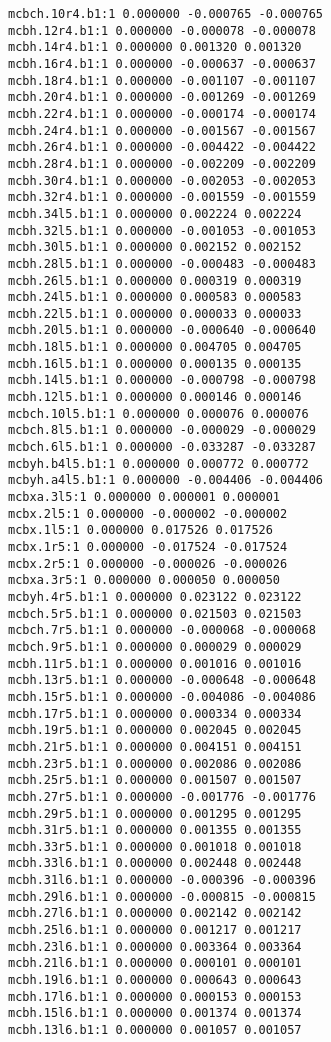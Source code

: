 \begin{verbatim}
mcbch.10r4.b1:1 0.000000 -0.000765 -0.000765
mcbh.12r4.b1:1 0.000000 -0.000078 -0.000078
mcbh.14r4.b1:1 0.000000 0.001320 0.001320
mcbh.16r4.b1:1 0.000000 -0.000637 -0.000637
mcbh.18r4.b1:1 0.000000 -0.001107 -0.001107
mcbh.20r4.b1:1 0.000000 -0.001269 -0.001269
mcbh.22r4.b1:1 0.000000 -0.000174 -0.000174
mcbh.24r4.b1:1 0.000000 -0.001567 -0.001567
mcbh.26r4.b1:1 0.000000 -0.004422 -0.004422
mcbh.28r4.b1:1 0.000000 -0.002209 -0.002209
mcbh.30r4.b1:1 0.000000 -0.002053 -0.002053
mcbh.32r4.b1:1 0.000000 -0.001559 -0.001559
mcbh.34l5.b1:1 0.000000 0.002224 0.002224
mcbh.32l5.b1:1 0.000000 -0.001053 -0.001053
mcbh.30l5.b1:1 0.000000 0.002152 0.002152
mcbh.28l5.b1:1 0.000000 -0.000483 -0.000483
mcbh.26l5.b1:1 0.000000 0.000319 0.000319
mcbh.24l5.b1:1 0.000000 0.000583 0.000583
mcbh.22l5.b1:1 0.000000 0.000033 0.000033
mcbh.20l5.b1:1 0.000000 -0.000640 -0.000640
mcbh.18l5.b1:1 0.000000 0.004705 0.004705
mcbh.16l5.b1:1 0.000000 0.000135 0.000135
mcbh.14l5.b1:1 0.000000 -0.000798 -0.000798
mcbh.12l5.b1:1 0.000000 0.000146 0.000146
mcbch.10l5.b1:1 0.000000 0.000076 0.000076
mcbch.8l5.b1:1 0.000000 -0.000029 -0.000029
mcbch.6l5.b1:1 0.000000 -0.033287 -0.033287
mcbyh.b4l5.b1:1 0.000000 0.000772 0.000772
mcbyh.a4l5.b1:1 0.000000 -0.004406 -0.004406
mcbxa.3l5:1 0.000000 0.000001 0.000001
mcbx.2l5:1 0.000000 -0.000002 -0.000002
mcbx.1l5:1 0.000000 0.017526 0.017526
mcbx.1r5:1 0.000000 -0.017524 -0.017524
mcbx.2r5:1 0.000000 -0.000026 -0.000026
mcbxa.3r5:1 0.000000 0.000050 0.000050
mcbyh.4r5.b1:1 0.000000 0.023122 0.023122
mcbch.5r5.b1:1 0.000000 0.021503 0.021503
mcbch.7r5.b1:1 0.000000 -0.000068 -0.000068
mcbch.9r5.b1:1 0.000000 0.000029 0.000029
mcbh.11r5.b1:1 0.000000 0.001016 0.001016
mcbh.13r5.b1:1 0.000000 -0.000648 -0.000648
mcbh.15r5.b1:1 0.000000 -0.004086 -0.004086
mcbh.17r5.b1:1 0.000000 0.000334 0.000334
mcbh.19r5.b1:1 0.000000 0.002045 0.002045
mcbh.21r5.b1:1 0.000000 0.004151 0.004151
mcbh.23r5.b1:1 0.000000 0.002086 0.002086
mcbh.25r5.b1:1 0.000000 0.001507 0.001507
mcbh.27r5.b1:1 0.000000 -0.001776 -0.001776
mcbh.29r5.b1:1 0.000000 0.001295 0.001295
mcbh.31r5.b1:1 0.000000 0.001355 0.001355
mcbh.33r5.b1:1 0.000000 0.001018 0.001018
mcbh.33l6.b1:1 0.000000 0.002448 0.002448
mcbh.31l6.b1:1 0.000000 -0.000396 -0.000396
mcbh.29l6.b1:1 0.000000 -0.000815 -0.000815
mcbh.27l6.b1:1 0.000000 0.002142 0.002142
mcbh.25l6.b1:1 0.000000 0.001217 0.001217
mcbh.23l6.b1:1 0.000000 0.003364 0.003364
mcbh.21l6.b1:1 0.000000 0.000101 0.000101
mcbh.19l6.b1:1 0.000000 0.000643 0.000643
mcbh.17l6.b1:1 0.000000 0.000153 0.000153
mcbh.15l6.b1:1 0.000000 0.001374 0.001374
mcbh.13l6.b1:1 0.000000 0.001057 0.001057

\end{verbatim}
